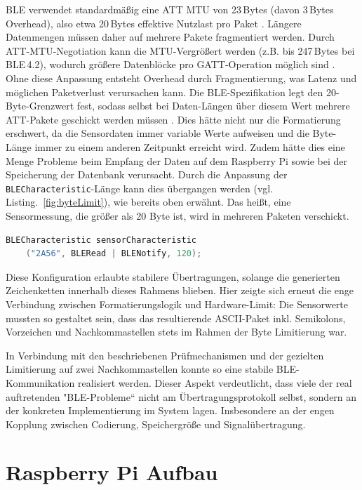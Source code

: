 BLE verwendet standardmäßig eine \ac{ATT MTU} von 23 Bytes (davon 3 Bytes Overhead), also etwa 20 Bytes effektive Nutzlast pro Paket \cite{tosi2017performance, arduinoBLEdoc}. Längere Datenmengen müssen daher auf mehrere Pakete fragmentiert werden. Durch ATT-MTU-Negotiation kann die MTU-Vergrößert werden (z.B. bis 247 Bytes bei BLE 4.2), wodurch größere Datenblöcke pro GATT-Operation möglich sind \cite{arduinoBLEdoc, murugalakshmi2023evolution}. Ohne diese Anpassung entsteht Overhead durch Fragmentierung, was Latenz und möglichen Paketverlust verursachen kann. Die BLE-Spezifikation legt den 20-Byte-Grenzwert fest, sodass selbst bei Daten-Längen über diesem Wert mehrere ATT-Pakete geschickt werden müssen \cite{tosi2017performance}. Dies hätte nicht nur die Formatierung erschwert, da die Sensordaten immer variable Werte aufweisen und die Byte-Länge immer zu einem anderen Zeitpunkt erreicht wird. Zudem hätte dies eine Menge Probleme beim Empfang der Daten auf dem Raspberry Pi sowie bei der Speicherung der Datenbank verursacht. Durch die Anpassung der \texttt{BLECharacteristic}-Länge kann dies übergangen werden (vgl. Listing.~\ref{fig:byteLimit}), wie bereits oben erwähnt. Das heißt, eine Sensormessung, die größer als 20 Byte ist, wird in mehreren Paketen verschickt. 

	\begin{lstlisting}[language=C++, caption={Ble Byte Limit Erhöhung}, label=fig:byteLimit]
	BLECharacteristic sensorCharacteristic
	("2A56", BLERead | BLENotify, 120);
	\end{lstlisting}

Diese Konfiguration erlaubte stabilere Übertragungen, solange die generierten Zeichenketten innerhalb dieses Rahmens blieben. Hier zeigte sich erneut die enge Verbindung zwischen Formatierungslogik und Hardware-Limit: Die Sensorwerte mussten so gestaltet sein, dass das resultierende ASCII-Paket inkl. Semikolons, Vorzeichen und Nachkommastellen stets im Rahmen der Byte Limitierung war.

In Verbindung mit den beschriebenen Prüfmechanismen und der gezielten Limitierung auf zwei Nachkommastellen konnte so eine stabile BLE-Kommunikation realisiert werden. Dieser Aspekt verdeutlicht, dass viele der real auftretenden "BLE-Probleme“ nicht am Übertragungsprotokoll selbst, sondern an der konkreten Implementierung im System lagen. Insbesondere an der engen Kopplung zwischen Codierung, Speichergröße und Signalübertragung.

\section{Raspberry Pi Aufbau}

